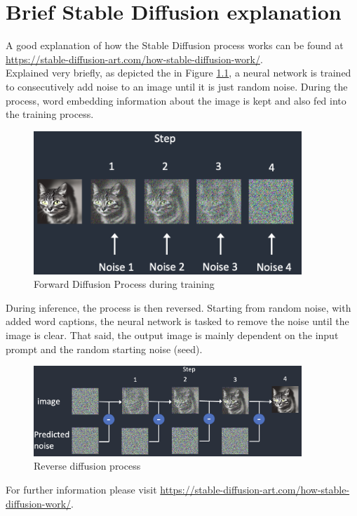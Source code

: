 \documentclass[
  a4paper,  %
  twoside,  %
  bibliography=totoc,
  headsepline,
  cleardoublepage=empty,
  parskip=half,
  draft=false
]{scrbook}
\begin{document}
\chapter{Brief Stable Diffusion explanation}
\label{app:diff-workflow}
A good explanation of how the Stable Diffusion process works can be found at \url{https://stable-diffusion-art.com/how-stable-diffusion-work/}. \\
Explained very briefly, as depicted the in Figure \ref{fig:forward-diff}, a neural network is trained to consecutively add noise to an image until it is just random noise. During the process, word embedding information about the image is kept and also fed into the training process.
\begin{figure}[h]
  \centering
  \includegraphics[width=0.9\textwidth]{./graphics/images/forward-diff.png}
  \caption{Forward Diffusion Process during training \cite{andrewHowDoesStable2022}}
  \label{fig:forward-diff}
\end{figure}

During inference, the process is then reversed. Starting from random noise, with added word captions, the neural network is tasked to remove the noise until the image is clear. That said, the output image is mainly dependent on the input prompt and the random starting noise (seed).

\begin{figure}[h]
  \centering
  \includegraphics[width=0.9\textwidth]{./graphics/images/reverse-diff.png}
  \caption{Reverse diffusion process \cite{andrewHowDoesStable2022}}
  \label{fig:backward-diff}
\end{figure}

For further information please visit \url{https://stable-diffusion-art.com/how-stable-diffusion-work/}.



% 

\pagestyle{empty}
\renewcommand*{\chapterpagestyle}{empty}
\Affirmation
\end{document}

